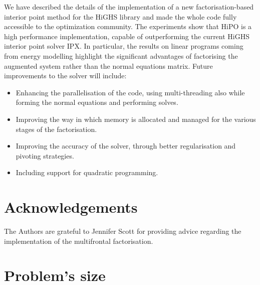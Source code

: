 \documentclass[a4paper]{article}
\newcommand{\0}{\mathbf 0}
\begin{document}
We have described the details of the implementation of a new factorisation-based interior point method for the HiGHS library and made the whole code fully accessible to the optimization community. The experiments show that HiPO is a high performance implementation, capable of outperforming the current HiGHS interior point solver IPX. In particular, the results on linear programs coming from energy modelling highlight the significant advantages of factorising the augmented system rather than the normal equations matrix. Future improvements to the solver will include:
\begin{itemize}
\item Enhancing the parallelisation of the code, using multi-threading also while forming the normal equations and performing solves.
\item Improving the way in which memory is allocated and managed for the various stages of the factorisation.
\item Improving the accuracy of the solver, through better regularisation and pivoting strategies.
\item Including support for quadratic programming.
\end{itemize}









\section*{Acknowledgements}
The Authors are grateful to Jennifer Scott for providing advice regarding the implementation of the multifrontal factorisation.






\appendix
\section{Problem's size}
\label{apx:size}
\end{document}
